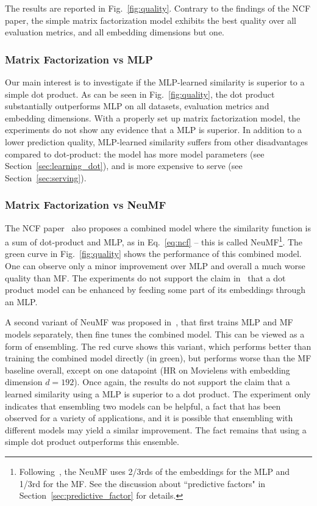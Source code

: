 \documentclass{article}
\begin{document}
The results are reported in Fig.~\ref{fig:quality}.
Contrary to the findings of the NCF paper, the simple matrix factorization model exhibits the best quality over all evaluation metrics, and all embedding dimensions but one.

\subsubsection{Matrix Factorization vs MLP}
Our main interest is to investigate if the MLP-learned similarity is superior to a simple dot product.
As can be seen in Fig.~\ref{fig:quality}, the dot product substantially outperforms MLP on all datasets, evaluation metrics and embedding dimensions.
With a properly set up matrix factorization model, the experiments do not show any evidence that a MLP is superior.
In addition to a lower prediction quality, MLP-learned similarity suffers from other disadvantages compared to dot-product: the model has more model parameters (see Section~\ref{sec:learning_dot}), and is more expensive to serve (see Section~\ref{sec:serving}).

\subsubsection{Matrix Factorization vs NeuMF}

The NCF paper~\cite{he:www17} also proposes a combined model where the similarity function is a sum of dot-product and MLP, as in Eq.~\eqref{eq:ncf} -- this is called NeuMF\footnote{Following~\cite{he:www17}, the NeuMF uses 2/3rds of the embeddings for the MLP and 1/3rd for the MF. See the discussion about ``predictive factors" in Section~\ref{sec:predictive_factor} for details.}.
The green curve in Fig.~\ref{fig:quality} shows the performance of this combined model.
One can observe only a minor improvement over MLP and overall a much worse quality than MF.
The experiments do not support the claim in~\cite{he:www17} that a dot product model can be enhanced by feeding some part of its embeddings through an MLP.

A second variant of NeuMF was proposed in~\cite{he:www17}, that first trains MLP and MF models separately, then fine tunes the combined model. This can be viewed as a form of ensembling.
The red curve shows this variant, which performs better than training the combined model directly (in green), but performs worse than the MF baseline overall, except on one datapoint (HR on Movielens with embedding dimension $d = 192$).
Once again, the results do not support the claim that a learned similarity using a MLP is superior to a dot product. The experiment only indicates that ensembling two models can be helpful, a fact that has been observed for a variety of applications, and it is possible that ensembling with different models may yield a similar improvement. The fact remains that using a simple dot product outperforms this ensemble.
\end{document}
